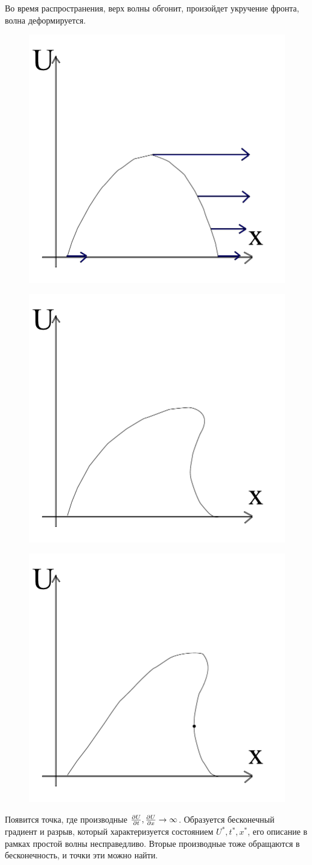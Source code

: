 Во время распространения, верх волны обгонит, произойдет укручение фронта, волна деформируется. 
\begin{figure}[H]
	\centering
	\includegraphics[width=0.4\linewidth]{fig/fig15.pdf}   
\end{figure}
\begin{figure}[H]
	\centering
	\includegraphics[width=0.4\linewidth]{fig/fig16.pdf}   
\end{figure}
\begin{figure}[H]
	\centering
	\includegraphics[width=0.4\linewidth]{fig/fig17.pdf}   
\end{figure}

Появится точка, где производные $\pdv{U}{t}, \pdv{U}{x} \rightarrow \infty $. Образуется бесконечный градиент и разрыв, который характеризуется состоянием $U^*, t^*, x^*$, его описание в рамках простой волны несправедливо. Вторые производные тоже обращаются в бесконечность, и точки эти можно найти.

